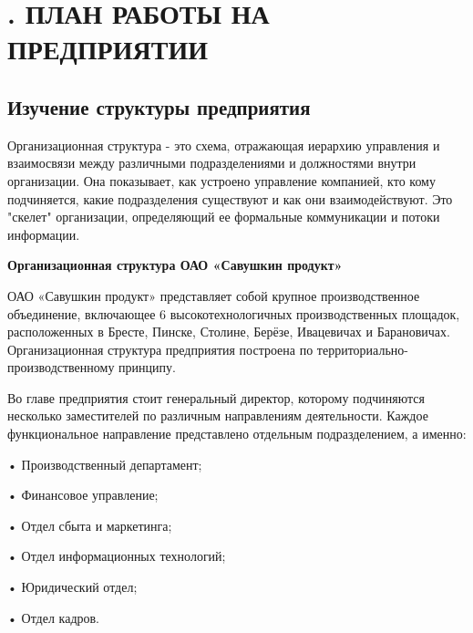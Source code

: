 \sectionbreak \section*{
  \gostTitleFont
  . ПЛАН РАБОТЫ НА ПРЕДПРИЯТИИ
}

\titlespace

\subsection*{ 
  \gostTitleFont
   Изучение структуры предприятия
} 

\subtitlespace

{\gostFont

  \par \redline Организационная структура - это схема, отражающая иерархию управления и взаимосвязи между различными подразделениями и должностями внутри организации. Она показывает, как устроено управление компанией, кто кому подчиняется, какие подразделения существуют и как они взаимодействуют. Это "скелет" организации, определяющий ее формальные коммуникации и потоки информации.

  \par \redline \textbf{Организационная структура ОАО «Савушкин продукт»}

  \par \redline ОАО «Савушкин продукт» представляет собой крупное производственное объединение, включающее 6 высокотехнологичных производственных площадок, расположенных в Бресте, Пинске, Столине, Берёзе, Ивацевичах и Барановичах. Организационная структура предприятия построена по территориально-производственному принципу.

  \par \redline Во главе предприятия стоит генеральный директор, которому подчиняются несколько заместителей по различным направлениям деятельности. Каждое функциональное направление представлено отдельным подразделением, а именно:
  
  \par \redline • Производственный департамент;
  \par \redline • Финансовое управление;
  \par \redline • Отдел сбыта и маркетинга;
  \par \redline • Отдел информационных технологий;
  \par \redline • Юридический отдел;
  \par \redline • Отдел кадров.

}
